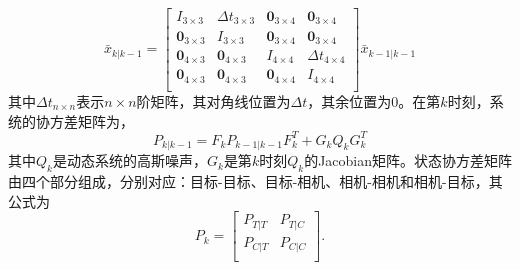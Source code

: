 \begin{equation}
\bar{x}_{k|k-1}=\left[\begin{matrix}
I_{3\times 3} & \Delta t_{3\times 3} & \textbf{0}_{3\times 4} & \textbf{0}_{3\times 4}\\
\textbf{0}_{3\times 3} & I_{3\times 3} & \textbf{0}_{3\times 4} & \textbf{0}_{3\times 4}\\
\textbf{0}_{4\times 3} & \textbf{0}_{4\times 3} & I_{4\times 4} & \Delta t_{4\times 4}\\
\textbf{0}_{4\times 3} & \textbf{0}_{4\times 3} & \textbf{0}_{4\times 4} & I_{4\times 4}\\
\end{matrix}\right]\bar{x}_{k-1|k-1}
\end{equation}
其中$\Delta t_{n \times n}$表示$n \times n$阶矩阵，其对角线位置为$\Delta t$，其余位置为0。在第$k$时刻，系统的协方差矩阵为，
\begin{equation}
P_{k|k-1}=F_kP_{k-1|k-1}F^T_k+G_kQ_kG^T_k
\end{equation}
其中$Q_k$是动态系统的高斯噪声，$G_k$是第$k$时刻$Q_k$的Jacobian矩阵。状态协方差矩阵由四个部分组成，分别对应：目标-目标、目标-相机、相机-相机和相机-目标，其公式为
\begin{equation}
P_k=\left[
\begin{matrix}
P_{T|T} & P_{T|C} \\
P_{C|T} & P_{C|C} \\
\end{matrix}\right].
\end{equation}

